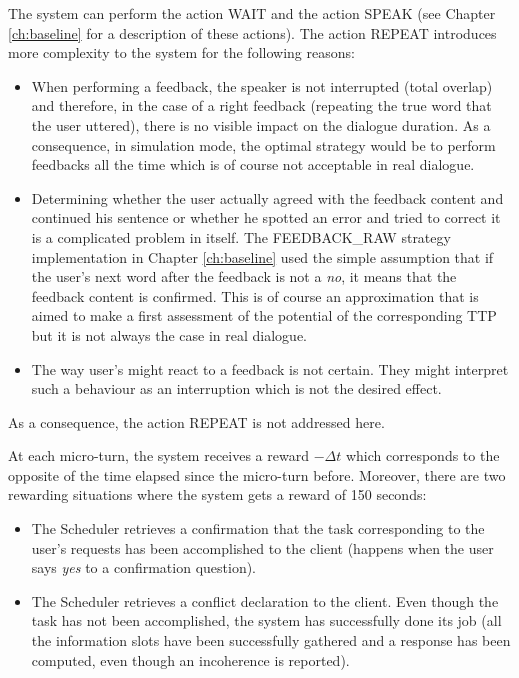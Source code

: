     	The system can perform the action WAIT and the action SPEAK (see Chapter \ref{ch:baseline} for a description of these actions). The action REPEAT introduces more complexity to the system for the following reasons:
			
			\begin{itemize}
				\item When performing a feedback, the speaker is not interrupted (total overlap) and therefore, in the case of a right feedback (repeating the true word that the user uttered), there is no visible impact on the dialogue duration. As a consequence, in simulation mode, the optimal strategy would be to perform feedbacks all the time which is of course not acceptable in real dialogue.
				\item Determining whether the user actually agreed with the feedback content and continued his sentence or whether he spotted an error and tried to correct it is a complicated problem in itself. The FEEDBACK\_RAW strategy implementation in Chapter \ref{ch:baseline} used the simple assumption that if the user's next word after the feedback is not a \textit{no}, it means that the feedback content is confirmed. This is of course an approximation that is aimed to make a first assessment of the potential of the corresponding TTP but it is not always the case in real dialogue.
				\item The way user's might react to a feedback is not certain. They might interpret such a behaviour as an interruption which is not the desired effect.
			\end{itemize}
			
			As a consequence, the action REPEAT is not addressed here.
        
    	At each micro-turn, the system receives a reward $-\Delta t$ which corresponds to the opposite of the time elapsed since the micro-turn before. Moreover, there are two rewarding situations where the system gets a reward of 150 seconds:
        
        \begin{itemize}
        	\item The Scheduler retrieves a confirmation that the task corresponding to the user's requests has been accomplished to the client (happens when the user says \textit{yes} to a confirmation question).
            \item The Scheduler retrieves a conflict declaration to the client. Even though the task has not been accomplished, the system has successfully done its job (all the information slots have been successfully gathered and a response has been computed, even though an incoherence is reported).
        \end{itemize}
        
